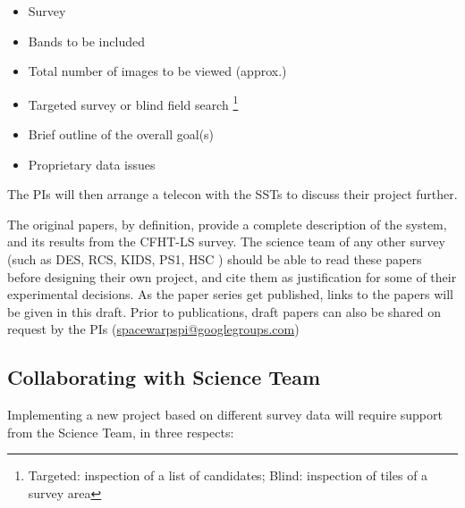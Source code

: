 \documentclass[a4paper]{article}
\begin{document}
\begin{itemize}
\item Survey
\item Bands to be included
\item Total number of images to be viewed (approx.)
\item Targeted survey or blind field search \footnote{Targeted: inspection of a list of candidates; Blind: inspection of tiles of a survey area}
\item Brief outline of the overall goal(s)
\item Proprietary data issues 
\end{itemize}

The \sw PIs will then arrange a telecon with the SSTs to discuss their project further.

The original \sw papers, by definition, provide a complete description of the system, and its results from the CFHT-LS survey. The science team of
any other survey (such as DES, RCS, KIDS, PS1, HSC \etc) should be able
to read these papers before designing their own \sw project, and cite them as justification for some of their experimental decisions. As the \sw paper series get published, links to the papers will be given in this draft. Prior to publications, draft papers can also be shared on request by the \sw PIs (\href{mailto:spacewarpspi@googlegroups.com}{spacewarpspi@googlegroups.com})

\subsection{Collaborating with \sw Science Team}

Implementing a new project based on different survey data will require support from the \sw Science Team, in three respects: 
\end{document}
